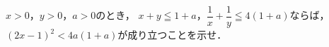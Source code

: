 \documentclass[../../main.tex]{subfiles}
\begin{document}
$x>0$，$y>0$，$a>0$のとき，
$x+y\leqq1+a$，$\displaystyle\dfrac{1}{x}+\dfrac{1}{y}\leqq4(1+a)$ならば，
${(2x-1)}^2<4a(1+a)$が成り立つことを示せ．
\end{document}
